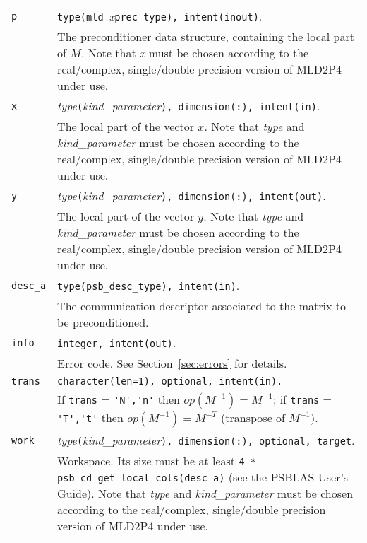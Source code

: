 \begin{tabular}{p{1.2cm}p{11.5cm}}
\verb|p|      & \verb|type(mld_|\emph{x}\verb|prec_type), intent(inout)|.\\
              & The preconditioner data structure, containing the local part of $M$.
                Note that \emph{x} must be chosen according
                to the real/complex, single/double precision version of MLD2P4 under use.\\
\verb|x|      & \emph{type}\verb|(|\emph{kind\_parameter}\verb|), dimension(:), intent(in)|.\\
              & The local part of the vector $x$. Note that \emph{type} and   
                \emph{kind\_parameter} must be chosen according
                to the real/complex, single/double precision version of MLD2P4 under use.\\
\verb|y|      & \emph{type}\verb|(|\emph{kind\_parameter}\verb|), dimension(:), intent(out)|.\\
              & The local part of the vector $y$. Note that \emph{type} and
                \emph{kind\_parameter} must be chosen according
                to the real/complex, single/double precision version of MLD2P4 under use.\\
\verb|desc_a| & \verb|type(psb_desc_type), intent(in)|. \\
              & The communication descriptor associated to the matrix to be
                preconditioned.\\
\verb|info|   & \verb|integer, intent(out)|.\\
              & Error code. See Section~\ref{sec:errors} for details.\\
\verb|trans|  & \verb|character(len=1), optional, intent(in).|\\
              & If \verb|trans| = \verb|'N','n'| then $op(M^{-1}) = M^{-1}$;
                if \verb|trans| = \verb|'T','t'| then $op(M^{-1}) = M^{-T}$
                (transpose of $M^{-1})$.\\
\verb|work|  & \emph{type}\verb|(|\emph{kind\_parameter}\verb|), dimension(:), optional, target|.\\
             & Workspace. Its size must be at
               least \verb|4 * psb_cd_get_local_cols(desc_a)| (see the PSBLAS User's Guide).
               Note that \emph{type} and \emph{kind\_parameter} must be chosen according
               to the real/complex, single/double precision version of MLD2P4 under use.\\
\end{tabular}


